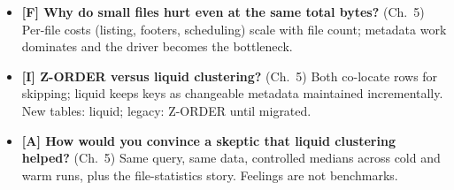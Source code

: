 \begin{itemize}
    \item \textbf{[F] Why do small files hurt even at the same total bytes?} (Ch.~5) Per-file
    costs (listing, footers, scheduling) scale with file count; metadata work dominates and
    the driver becomes the bottleneck.
    \item \textbf{[I] Z-ORDER versus liquid clustering?} (Ch.~5) Both co-locate rows for
    skipping; liquid keeps keys as changeable metadata maintained incrementally. New tables:
    liquid; legacy: Z-ORDER until migrated.
    \item \textbf{[A] How would you convince a skeptic that liquid clustering helped?}
    (Ch.~5) Same query, same data, controlled medians across cold and warm runs, plus the
    file-statistics story. Feelings are not benchmarks.
\end{itemize}

